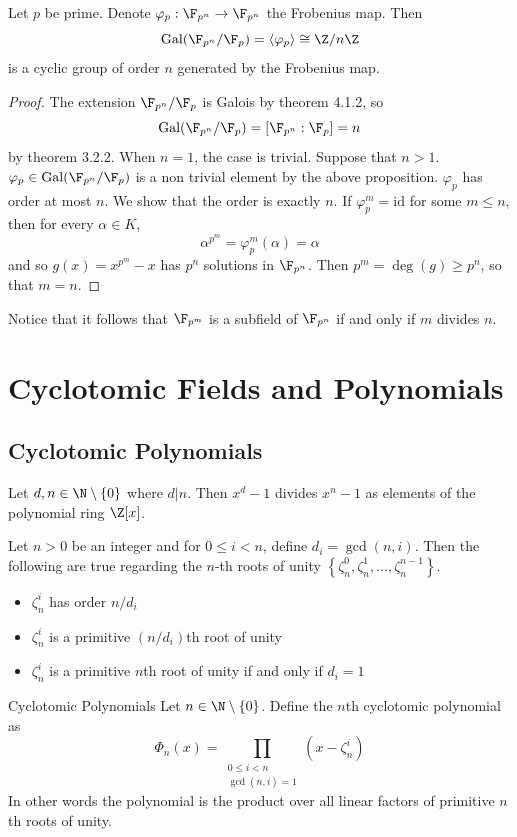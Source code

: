 \documentclass[a4paper]{article}
\begin{document}
\begin{thm}{}{} Let $p$ be prime. Denote $\varphi_p:\F_{p^n}\to\F_{p^n}$ the Frobenius map. Then $$\text{Gal}(\F_{p^n}/\F_p)=\langle\varphi_p\rangle\cong\Z/n\Z$$ is a cyclic group of order $n$ generated by the Frobenius map. 
\begin{proof}
The extension $\F_{p^n}/\F_p$ is Galois by theorem 4.1.2, so $$\text{Gal}(\F_{p^n}/\F_p)=[\F_{p^n}:\F_p]=n$$ by theorem 3.2.2. When $n=1$, the case is trivial. Suppose that $n>1$. $\varphi_p\in\text{Gal}(\F_{p^n}/\F_p)$ is a non trivial element by the above proposition. $\varphi_p$ has order at most $n$. We show that the order is exactly $n$. If $\varphi_p^m=\text{id}$ for some $m\leq n$, then for every $\alpha\in K$, $$\alpha^{p^m}=\varphi_p^m(\alpha)=\alpha$$ and so $g(x)=x^{p^m}-x$ has $p^n$ solutions in $\F_{p^n}$. Then $p^m=\deg(g)\geq p^n$, so that $m=n$. 
\end{proof}
\end{thm}

Notice that it follows that $\F_{p^m}$ is a subfield of $\F_{p^n}$ if and only if $m$ divides $n$. 

\pagebreak
\section{Cyclotomic Fields and Polynomials}
\subsection{Cyclotomic Polynomials}
\begin{lmm}{}{} Let $d,n\in\N\setminus\{0\}$ where $d|n$. Then $x^d-1$ divides $x^n-1$ as elements of the polynomial ring $\Z[x]$. 
\end{lmm}

\begin{lmm}{}{} Let $n>0$ be an integer and for $0\leq i<n$, define $d_i=\gcd(n,i)$. Then the following are true regarding the $n$-th roots of unity $\left\{\zeta_n^0,\zeta_n^1,\dots,\zeta_n^{n-1}\right\}$. 
\begin{itemize}
\item $\zeta_n^i$ has order $n/d_i$
\item $\zeta_n^i$ is a primitive $(n/d_i)$th root of unity
\item $\zeta_n^i$ is a primitive $n$th root of unity if and only if $d_i=1$
\end{itemize}
\end{lmm}

\begin{defn}{Cyclotomic Polynomials}{} Let $n\in\N\setminus\{0\}$. Define the $n$th cyclotomic polynomial as $$\Phi_n(x)=\prod_{\substack{0\leq i<n\\\gcd(n,i)=1}}\left(x-\zeta_n^i\right)$$
In other words the polynomial is the product over all linear factors of primitive $n$th roots of unity. 
\end{defn}
\end{document}
